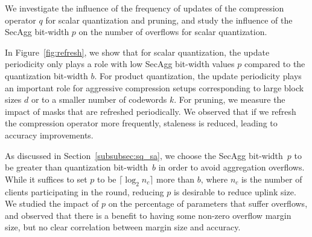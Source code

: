 \documentclass[11pt]{article}
\newcommand{\SecAgg}{{\sc SecAgg}\xspace}
\begin{document}
We investigate the influence of the frequency of updates of the compression operator $q$ for scalar quantization and pruning, and study the influence of the \SecAgg bit-width $p$ on the number of overflows for scalar quantization.

 In Figure~\ref{fig:refresh}, we show that for scalar quantization, the update periodicity only plays a role with low \SecAgg bit-width values $p$ compared to the quantization bit-width $b$. For product quantization, the update periodicity plays an important role for aggressive compression setups corresponding to large block sizes $d$ or to a smaller number of codewords $k$. For pruning, we measure the impact of masks that are refreshed periodically.
We observed that if we refresh the compression operator more frequently, staleness is reduced, leading to accuracy improvements.

As discussed in Section~\ref{subsubsec:sq_sa}, we choose the \SecAgg bit-width~$p$ to be greater than quantization bit-width~$b$ in order to avoid aggregation overflows. While it suffices to set $p$ to be $\lceil\log_2 n_c\rceil$ more than $b$, where $n_c$ is the number of clients participating in the round, reducing $p$ is desirable to reduce uplink size.
We studied the impact of  $p$ on the percentage of parameters that suffer overflows, and
observed that there is a benefit to having some non-zero overflow margin size, but no clear correlation between margin size and accuracy.

\end{document}

